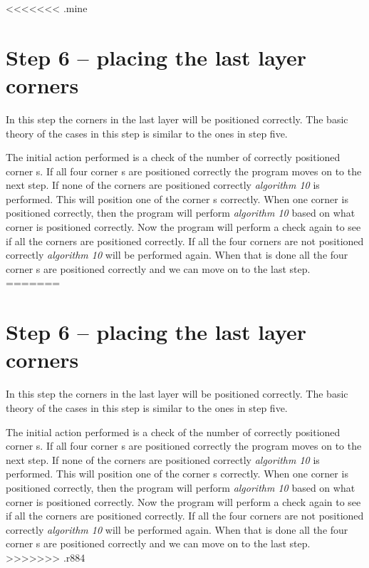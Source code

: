<<<<<<< .mine
\section{Step 6 -- placing the last layer corners}
In this step the corners in the last layer will be positioned correctly. 
The basic theory of the cases in this step is similar to the ones in step five.

The initial action performed is a check of the number of correctly positioned corner \cpiece{}s. 
If all four corner \cpiece{}s are positioned correctly the program moves on to the next step.
If none of the corners are positioned correctly \textit{algorithm 10} is performed. This will position one of the corner \cpiece{}s correctly.
When one corner is positioned correctly, then the program will perform \textit{algorithm 10} based on what corner is positioned correctly.
Now the program will perform a check again to see if all the corners are positioned correctly. If all the four corners are not positioned correctly \textit{algorithm 10} will be performed again.
When that is done all the four corner \cpiece{}s are positioned correctly and we can move on to the last step.
=======
\section{Step 6 -- placing the last layer corners}
In this step the corners in the last layer will be positioned correctly. 
The basic theory of the cases in this step is similar to the ones in step five.

The initial action performed is a check of the number of correctly positioned corner \cpiece{}s. 
If all four corner \cpiece{}s are positioned correctly the program moves on to the next step.
If none of the corners are positioned correctly \textit{algorithm 10} is performed. This will position one of the corner \cpiece{}s correctly.
When one corner is positioned correctly, then the program will perform \textit{algorithm 10} based on what corner is positioned correctly.
Now the program will perform a check again to see if all the corners are positioned correctly. If all the four corners are not positioned correctly \textit{algorithm 10} will be performed again.
When that is done all the four corner \cpiece{}s are positioned correctly and we can move on to the last step.
>>>>>>> .r884
